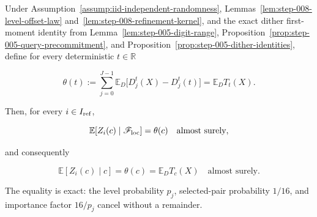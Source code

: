 \begin{proposition}\label{prop:step-008-conditional-mean}
Under Assumption~\ref{assump:iid-independent-randomness}, Lemmas~\ref{lem:step-008-level-offset-law} and~\ref{lem:step-008-refinement-kernel}, and the exact dither first-moment identity from Lemma~\ref{lem:step-005-digit-range}, Proposition~\ref{prop:step-005-query-precommitment}, and Proposition~\ref{prop:step-005-dither-identities}, define for every deterministic \(t\in\mathbb R\)

\[
\theta(t)
:=\sum_{j=0}^{J-1}\mathbb E_D\bigl[D_j^t(X)-D_j^t(t)\bigr]
=\mathbb E_DT_t(X).
\]

Then, for every \(i\in I_{\rm ref}\),

\[
\mathbb E[Z_i(c)\mid\mathscr F_{\rm loc}]=\theta(c)
\quad\text{almost surely},
\]

and consequently

\[
\boxed{\mathbb E[Z_i(c)\mid c]=\theta(c)=\mathbb E_DT_c(X)}
\quad\text{almost surely}.
\]

The equality is exact: the level probability \(p_j\), selected-pair probability \(1/16\), and importance factor \(16/p_j\) cancel without a remainder.
\end{proposition}

